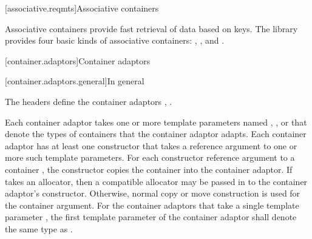 \setcounter{subsection}{6}

\noindent\makebox[\linewidth]{\rule{\textwidth}{0.4pt}}

[associative.reqmts]{Associative containers}

\pnum
Associative containers provide fast retrieval of data based on keys.
The library provides four basic kinds of associative containers:
,
,
and
.

\setcounter{chapter}{24}
\setcounter{section}{5}
[container.adaptors]{Container adaptors}

[container.adaptors.general]{In general}

\pnum
The headers   define the container adaptors ,
 .

\pnum
{}
{Each container adaptor takes one or more template parameters
named , , or  that
denote the types of containers that the container adaptor adapts.  Each
container adaptor has at least one constructor that takes a reference argument
to one or more such template parameters.  For each constructor reference
argument to a container , the constructor copies the container into
the container adaptor.  If  takes an allocator, then a compatible
allocator may be passed in to the container adaptor's constructor. Otherwise,
normal copy or move construction is used for the container argument.  For the
container adaptors that take a single template parameter ,
the first template parameter  of the container adaptor shall denote
the same type as .}

